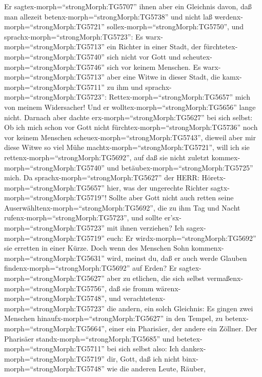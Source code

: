  Er sagtex-morph=``strongMorph:TG5707'' ihnen aber ein
Gleichnis davon, daß man allezeit betenx-morph=``strongMorph:TG5738''
und nicht laß werdenx-morph=``strongMorph:TG5721''
sollex-morph=``strongMorph:TG5750'',  und
sprachx-morph=``strongMorph:TG5723'': Es
warx-morph=``strongMorph:TG5713'' ein Richter in einer Stadt, der
fürchtetex-morph=``strongMorph:TG5740'' sich nicht vor Gott und
scheutex-morph=``strongMorph:TG5746'' sich vor keinem Menschen.
 Es warx-morph=``strongMorph:TG5713'' aber eine Witwe in
dieser Stadt, die kamx-morph=``strongMorph:TG5711'' zu ihm und
sprachx-morph=``strongMorph:TG5723'':
Rettex-morph=``strongMorph:TG5657'' mich von meinem Widersacher!
 Und er wolltex-morph=``strongMorph:TG5656'' lange nicht.
Darnach aber dachte erx-morph=``strongMorph:TG5627'' bei sich selbst: Ob
ich mich schon vor Gott nicht fürchtex-morph=``strongMorph:TG5736'' noch
vor keinem Menschen scheuex-morph=``strongMorph:TG5743'', 
dieweil aber mir diese Witwe so viel Mühe
machtx-morph=``strongMorph:TG5721'', will ich sie
rettenx-morph=``strongMorph:TG5692'', auf daß sie nicht zuletzt
kommex-morph=``strongMorph:TG5740'' und
betäubex-morph=``strongMorph:TG5725'' mich.  Da
sprachx-morph=``strongMorph:TG5627'' der HERR:
Höretx-morph=``strongMorph:TG5657'' hier, was der ungerechte Richter
sagtx-morph=``strongMorph:TG5719''!  Sollte aber Gott nicht
auch retten seine Auserwähltenx-morph=``strongMorph:TG5692'', die zu ihm
Tag und Nacht rufenx-morph=``strongMorph:TG5723'', und sollte
er'sx-morph=``strongMorph:TG5723'' mit ihnen verziehen?  Ich
sagex-morph=``strongMorph:TG5719'' euch: Er
wirdx-morph=``strongMorph:TG5692'' sie erretten in einer Kürze. Doch
wenn des Menschen Sohn kommenx-morph=``strongMorph:TG5631'' wird, meinst
du, daß er auch werde Glauben findenx-morph=``strongMorph:TG5692'' auf
Erden?  Er sagtex-morph=``strongMorph:TG5627'' aber zu
etlichen, die sich selbst vermaßenx-morph=``strongMorph:TG5756'', daß
sie fromm wärenx-morph=``strongMorph:TG5748'', und
verachtetenx-morph=``strongMorph:TG5723'' die andern, ein solch
Gleichnis:  Es gingen zwei Menschen
hinaufx-morph=``strongMorph:TG5627'' in den Tempel, zu
betenx-morph=``strongMorph:TG5664'', einer ein Pharisäer, der andere ein
Zöllner.  Der Pharisäer standx-morph=``strongMorph:TG5685''
und betetex-morph=``strongMorph:TG5711'' bei sich selbst also: Ich
dankex-morph=``strongMorph:TG5719'' dir, Gott, daß ich nicht
binx-morph=``strongMorph:TG5748'' wie die anderen Leute, Räuber,
